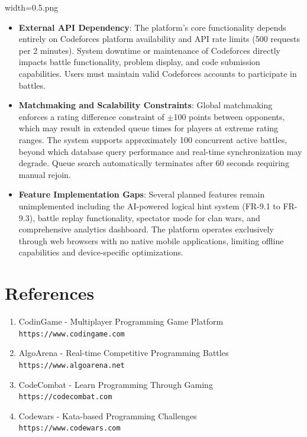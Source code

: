 width=0.5\linewidthimage.png\documentclass[12pt,a4paper]{article}
\begin{document}
\begin{itemize}
\item \textbf{External API Dependency}: The platform's core functionality depends entirely on Codeforces platform availability and API rate limits (500 requests per 2 minutes). System downtime or maintenance of Codeforces directly impacts battle functionality, problem display, and code submission capabilities. Users must maintain valid Codeforces accounts to participate in battles.

\item \textbf{Matchmaking and Scalability Constraints}: Global matchmaking enforces a rating difference constraint of $\pm$100 points between opponents, which may result in extended queue times for players at extreme rating ranges. The system supports approximately 100 concurrent active battles, beyond which database query performance and real-time synchronization may degrade. Queue search automatically terminates after 60 seconds requiring manual rejoin.

\item \textbf{Feature Implementation Gaps}: Several planned features remain unimplemented including the AI-powered logical hint system (FR-9.1 to FR-9.3), battle replay functionality, spectator mode for clan wars, and comprehensive analytics dashboard. The platform operates exclusively through web browsers with no native mobile applications, limiting offline capabilities and device-specific optimizations.
\end{itemize}

\section{References}

\begin{enumerate}
\item CodinGame - Multiplayer Programming Game Platform \\
\texttt{https://www.codingame.com}

\item AlgoArena - Real-time Competitive Programming Battles \\
\texttt{https://www.algoarena.net}

\item CodeCombat - Learn Programming Through Gaming \\
\texttt{https://codecombat.com}

\item Codewars - Kata-based Programming Challenges \\
\texttt{https://www.codewars.com}
\end{enumerate}
\end{document}
